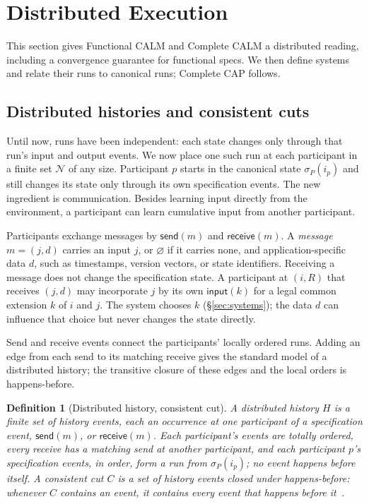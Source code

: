 \documentclass[sigconf]{cidr-2027}
\newtheorem{definition}{Definition}
\theoremstyle{remark}
\begin{document}
\section{Distributed Execution}
\label{sec:distributed-execution}

This section gives Functional CALM and Complete CALM a distributed reading,
including a convergence guarantee for functional specs.  We then define
systems and relate their runs to canonical runs; Complete CAP follows.

\subsection{Distributed histories and consistent cuts}
\label{sec:histories}
\label{sec:distributed-consistency}

Until now, runs have been independent: each state changes only through that
run's input and output events.  We now place one such run at each participant in
a finite set $\mathcal N$ of any size.  Participant $p$ starts in the canonical state
$\sigma_P(i_p)$ and still changes its state only through its own specification
events.  The new ingredient is communication.  Besides learning input directly
from the environment, a participant can learn cumulative input from another
participant.

Participants exchange messages by $\mathsf{send}(m)$ and $\mathsf{receive}(m)$.
A \emph{message} $m=(j,d)$ carries an input $j$, or $\varnothing$ if it
carries none, and application-specific data $d$, such as timestamps, version
vectors, or state identifiers.  Receiving a message does not change the
specification state.  A participant at $(i,R)$ that receives $(j,d)$ may incorporate $j$ by its own $\mathsf{input}(k)$ for a legal common extension $k$ of $i$ and $j$.  The system chooses $k$ (\S\ref{sec:systems}); the data $d$ can
influence that choice but never changes the state directly.

Send and receive events connect the participants' locally ordered runs.  Adding
an edge from each send to its matching receive gives the standard model of a
distributed history; the transitive closure of these edges and the local orders
is happens-before.

\begin{definition}[Distributed history, consistent cut]
\label{def:distributed-history}
A \emph{distributed history} $H$ is a finite set of \emph{history events}, each
an occurrence at one participant of a specification event, $\mathsf{send}(m)$,
or $\mathsf{receive}(m)$.  Each participant's events are totally ordered, every
receive has a matching send at another participant, and each participant $p$'s
specification events, in order, form a run from $\sigma_P(i_p)$; no event
happens before itself.  A \emph{consistent cut} $C$ is a set of history events closed under
happens-before: whenever $C$ contains an event, it contains every event that
happens before it~\cite{lamport1978time,chandy1985distributed}.
\end{definition}
\end{document}

